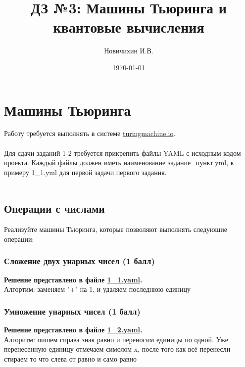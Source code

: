 \documentclass[a4paper,12pt]{article}
\author{Новичихин И.В.}
\title{ДЗ №3: Машины Тьюринга и квантовые вычисления}
\date{\today}
\begin{document}
\maketitle
\newpage






\section{Машины Тьюринга}

Работу требуется выполнять в системе \url{turingmachine.io}. \\\\
Для сдачи заданий 1-2 требуется прикрепить файлы YAML с исходным кодом проекта. Каждый файлы должен иметь наименование задание\_пункт.yml, к примеру 1\_1.yml для первой задачи первого задания. \\\\


\subsection{Операции с числами}

Реализуйте машины Тьюринга, которые позволяют выполнять следующие операции:

\subsubsection{Сложение двух унарных чисел (1 балл)}

\textbf{Решение представлено в файле \href{https://github.com/NRU-MPEI-IMAI/tm-and-qc-NovichikhinIV/blob/main/yaml/1_1.yaml}{1\_1.yaml}.} \\

Алгортим: заменяем "+" на 1, и удаляем последнюю единицу


\subsubsection{Умножение унарных чисел (1 балл)}

\textbf{Решение представлено в файле \href{https://github.com/NRU-MPEI-IMAI/tm-and-qc-NovichikhinIV/blob/main/yaml/1_2.yaml}{1\_2.yaml}.} \\

Алгоритм: пишем справа знак равно и переносим единицы по одной. Уже перенесенную единицу отмечаем симолом x, после того как всё перенесли стираем то что слева от равно и само равно \\\\
\end{document}
